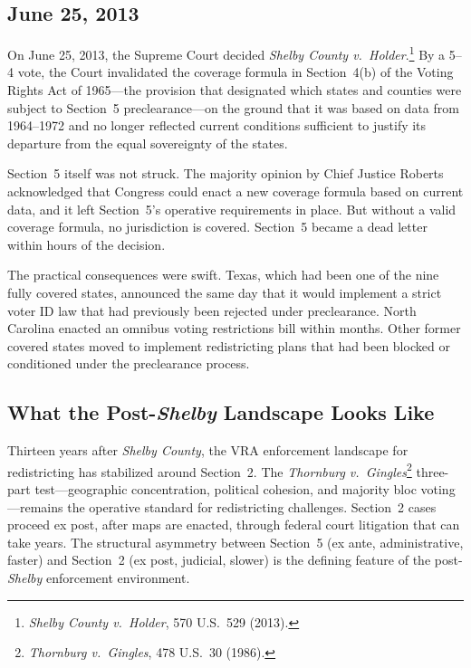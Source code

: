 \label{sec:introduction}

\subsection{June 25, 2013}

On June 25, 2013, the Supreme Court decided \textit{Shelby County v.\
Holder}.\footnote{\textit{Shelby County v.\ Holder}, 570 U.S.\ 529 (2013).}
By a 5--4 vote, the Court invalidated the coverage formula in Section~4(b)
of the Voting Rights Act of 1965---the provision that designated which
states and counties were subject to Section~5 preclearance---on the ground
that it was based on data from 1964--1972 and no longer reflected current
conditions sufficient to justify its departure from the equal sovereignty
of the states.

Section~5 itself was not struck. The majority opinion by Chief Justice
Roberts acknowledged that Congress could enact a new coverage formula
based on current data, and it left Section~5's operative requirements
in place. But without a valid coverage formula, no jurisdiction is
covered. Section~5 became a dead letter within hours of the decision.

The practical consequences were swift. Texas, which had been one of
the nine fully covered states, announced the same day that it would
implement a strict voter ID law that had previously been rejected
under preclearance. North Carolina enacted an omnibus voting restrictions
bill within months. Other former covered states moved to implement
redistricting plans that had been blocked or conditioned under
the preclearance process.

\subsection{What the Post-\textit{Shelby} Landscape Looks Like}

Thirteen years after \textit{Shelby County}, the VRA enforcement landscape
for redistricting has stabilized around Section~2. The \textit{Thornburg
v.\ Gingles}\footnote{\textit{Thornburg v.\ Gingles}, 478 U.S.\ 30 (1986).}
three-part test---geographic concentration, political cohesion, and
majority bloc voting---remains the operative standard for redistricting
challenges. Section~2 cases proceed ex post, after maps are enacted,
through federal court litigation that can take years. The structural
asymmetry between Section~5 (ex ante, administrative, faster) and Section~2
(ex post, judicial, slower) is the defining feature of the post-\textit{Shelby}
enforcement environment.

